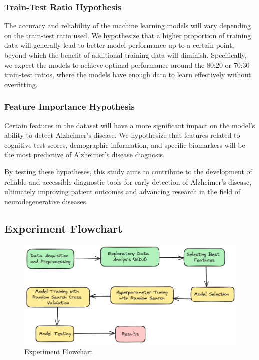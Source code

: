 \documentclass[a4paper,12pt]{report}
\begin{document}
\subsubsection{Train-Test Ratio Hypothesis}
The accuracy and reliability of the machine learning models will vary depending on the train-test ratio used. We hypothesize that a higher proportion of training data will generally lead to better model performance up to a certain point, beyond which the benefit of additional training data will diminish. Specifically, we expect the models to achieve optimal performance around the 80:20 or 70:30 train-test ratios, where the models have enough data to learn effectively without overfitting.

\subsubsection{Feature Importance Hypothesis}
Certain features in the dataset will have a more significant impact on the model's ability to detect Alzheimer's disease. We hypothesize that features related to cognitive test scores, demographic information, and specific biomarkers will be the most predictive of Alzheimer's disease diagnosis.

By testing these hypotheses, this study aims to contribute to the development of reliable and accessible diagnostic tools for early detection of Alzheimer's disease, ultimately improving patient outcomes and advancing research in the field of neurodegenerative diseases.

\subsection{Experiment Flowchart}

\begin{figure}[h]
    \centering
    \includegraphics[width=\textwidth]{experiment_flowchart.png}
    \caption{Experiment Flowchart}
    \label{fig:experiment_flowchart}
\end{figure}
\end{document}
